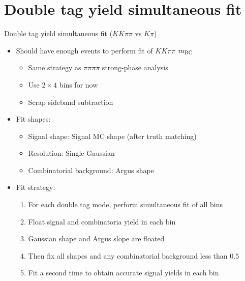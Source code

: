 \documentclass{beamer}
\begin{document}
\section{Double tag yield simultaneous fit}
\begin{frame}{Double tag yield simultaneous fit ($KK\pi\pi$ vs $K\pi$)}
  \begin{itemize}
    \setlength\itemsep{1.5em}
    \item{Should have enough events to perform fit of $KK\pi\pi$ $m_{\rm BC}$}
    \begin{itemize}
      \item{Same strategy as $\pi\pi\pi\pi$ strong-phase analysis}
      \item{Use $2\times 4$ bins for now}
      \item{Scrap sideband subtraction}
    \end{itemize}
    \item{Fit shapes:}
    \begin{itemize}
      \item{Signal shape: Signal MC shape (after truth matching)}
      \item{Resolution: Single Gaussian}
      \item{Combinatorial background: Argus shape}
    \end{itemize}
    \item{Fit strategy:}
    \begin{enumerate}
      \item{For each double tag mode, perform simultaneous fit of all bins}
      \item{Float signal and combinatoria yield in each bin}
      \item{Gaussian shape and Argus slope are floated}
      \item{Then fix all shapes and any combinatorial background less than $0.5$}
      \item{Fit a second time to obtain accurate signal yields in each bin}
    \end{enumerate}
  \end{itemize}
\end{frame}
\end{document}

